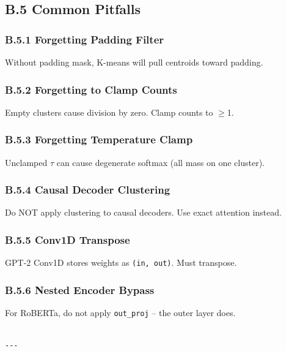 \subsection{B.5 Common Pitfalls}

\subsubsection{B.5.1 Forgetting Padding Filter}

Without padding mask, K-means will pull centroids toward padding.

\subsubsection{B.5.2 Forgetting to Clamp Counts}

Empty clusters cause division by zero. Clamp counts to $\ge$1.

\subsubsection{B.5.3 Forgetting Temperature Clamp}

Unclamped $\tau$ can cause degenerate softmax (all mass on one cluster).

\subsubsection{B.5.4 Causal Decoder Clustering}

Do NOT apply clustering to causal decoders. Use exact attention instead.

\subsubsection{B.5.5 Conv1D Transpose}

GPT-2 Conv1D stores weights as \texttt{(in, out)}. Must transpose.

\subsubsection{B.5.6 Nested Encoder Bypass}

For RoBERTa, do not apply \texttt{out\_proj} -- the outer layer does.
\begin{lstlisting}

---
\end{lstlisting}
